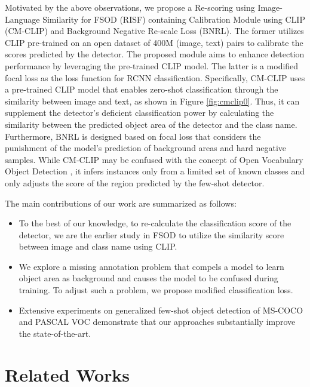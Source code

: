 \documentclass{article}
\begin{document}
Motivated by the above observations, we propose a Re-scoring using Image-Language Similarity for FSOD (RISF) containing Calibration Module using CLIP (CM-CLIP) and Background Negative Re-scale Loss (BNRL).
The former utilizes CLIP pre-trained on an open dataset of 400M (image, text) pairs to calibrate the scores predicted by the detector. The proposed module aims to enhance detection performance by leveraging the pre-trained CLIP model.
The latter is a modified focal loss \cite{retina} as the loss function for RCNN classification.
Specifically, CM-CLIP uses a pre-trained CLIP model that enables zero-shot classification through the similarity between image and text, as shown in Figure \ref{fig:cmclip0}. 
Thus, it can supplement the detector's deficient classification power by calculating the similarity between the predicted object area of the detector and the class name.
Furthermore, BNRL is designed based on focal loss that considers the punishment of the model's prediction of background areas and hard negative samples.
While CM-CLIP may be confused with the concept of Open Vocabulary Object Detection \cite{vild,regionclip}, it infers instances only from a limited set of known classes and only adjusts the score of the region predicted by the few-shot detector. 

The main contributions of our work are summarized as follows:

\begin{itemize}
    \item To the best of our knowledge, to re-calculate the classification score of the detector, we are the earlier study in FSOD to utilize the similarity score between image and class name using CLIP.
    \item We explore a missing annotation problem that compels a model to learn object area as background and causes the model to be confused during training. To adjust such a problem, we propose modified classification loss.
    \item Extensive experiments on generalized few-shot object detection of MS-COCO and PASCAL VOC demonstrate that our approaches substantially improve the state-of-the-art.
\end{itemize}



\section{Related Works}
\end{document}
